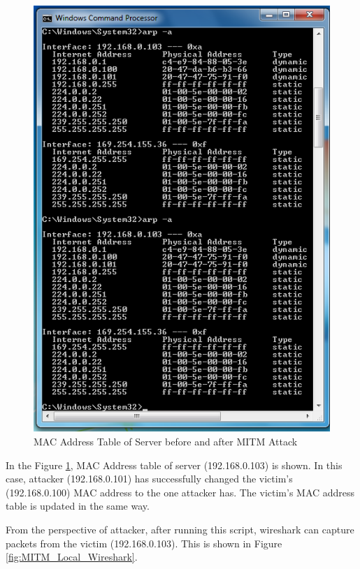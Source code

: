 \documentclass[14pt]{extarticle}
\begin{document}
            \begin{figure}
                \centering
                \includegraphics[width=.95\textwidth]{Pictures/MITM_Local/arp.png}
                \caption{MAC Address Table of Server before and after MITM Attack}
                \label{fig:MITM_Local_Arp}
            \end{figure}
            
            In the Figure \ref{fig:MITM_Local_Arp}, MAC Address table of server (192.168.0.103) is shown. In this case, attacker (192.168.0.101) has successfully changed the victim's (192.168.0.100) MAC address to the one attacker has. The victim's MAC address table is updated in the same way.
            
            From the perspective of attacker, after running this script, wireshark can capture packets from the victim (192.168.0.103). This is shown in Figure \ref{fig:MITM_Local_Wireshark}.
            
\end{document}
